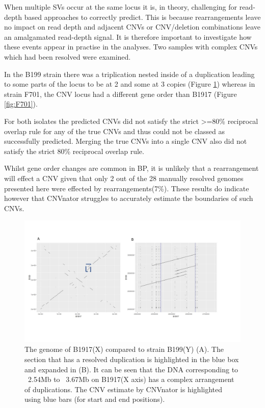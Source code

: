 \documentclass{article}
\begin{document}
When multiple SVs occur at the same locus it is, in theory, challenging for read-depth based approaches to correctly predict. This is because rearrangements leave no impact on read depth and adjacent CNVs or CNV/deletion combinations leave an amalgamated read-depth signal.   It is therefore important to investigate how these events appear in practise in the analyses. Two samples with complex CNVs which had been resolved were examined.

In the B199 strain there was a triplication nested inside of a duplication leading to some parts of the locus to be at 2 and some at 3 copies (Figure \ref{fig:B199}) whereas in strain F701, the CNV locus had a different gene order than B1917 (Figure \ref{fig:F701}). 

For both isolates the predicted CNVs did not satisfy the strict >=80\% reciprocal overlap rule for any of the true CNVs and thus could not be classed as successfully predicted. Merging the true CNVs into a single CNV also did not satisfy the strict 80\% reciprocal overlap rule.



Whilst gene order changes are common in BP, it is unlikely that a rearrangement will effect a CNV given that only 2 out of the 28 manually resolved genomes presented here were effected by rearrangements(7\%). These results do indicate however that CNVnator struggles to accurately estimate the boundaries of such CNVs.




\begin{figure}[h!]
\centering
\includegraphics[width=\textwidth{}]{Chapter_1/b199.jpg}
\caption{The genome of B1917(X) compared to strain B199(Y) (A). The section that has a resolved duplication is highlighted in the blue box and expanded in (B). It can be seen that the DNA corresponding to ~2.54Mb to ~3.67Mb on B1917(X axis) has a complex arrangement of duplications. The  CNV estimate by CNVnator is highlighted using blue bars (for start and end positions).}
\label{fig:B199}
\end{figure}
\end{document}
